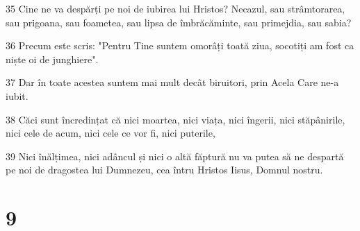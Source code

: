 \par 35 Cine ne va despărți pe noi de iubirea lui Hristos? Necazul, sau strâmtorarea, sau prigoana, sau foametea, sau lipsa de îmbrăcăminte, sau primejdia, sau sabia?
\par 36 Precum este scris: "Pentru Tine suntem omorâți toată ziua, socotiți am fost ca niște oi de junghiere".
\par 37 Dar în toate acestea suntem mai mult decât biruitori, prin Acela Care ne-a iubit.
\par 38 Căci sunt încredințat că nici moartea, nici viața, nici îngerii, nici stăpânirile, nici cele de acum, nici cele ce vor fi, nici puterile,
\par 39 Nici înălțimea, nici adâncul și nici o altă făptură nu va putea să ne despartă pe noi de dragostea lui Dumnezeu, cea întru Hristos Iisus, Domnul nostru.

\chapter{9}

